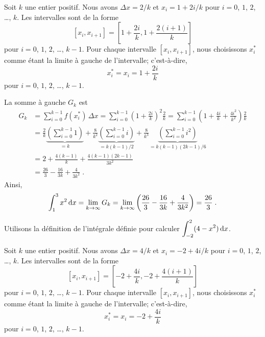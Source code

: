 {\begin{egg}
Soit $k$ une entier positif.  Nous avons $\Delta x = 2/k$ et
$x_i = 1 + 2i/k$ pour $i=0$, $1$, $2$, \ldots, $k$.  Les intervalles
sont de la forme
\[
[x_i,x_{i+1}] = \left[1+ \frac{2i}{k}, 1+ \frac{2(i+1)}{k}\right]
\]
pour $i=0$, $1$, $2$, \ldots, $k-1$.  Pour chaque intervalle
$[x_i, x_{i+1}]$, nous choisissons $x_i^\ast$ comme étant la limite à gauche
de l'intervalle; c'est-à-dire,
\[
x_i^\ast = x_i = 1+ \frac{2i}{k}
\]
pour $i=0$, $1$, $2$, \ldots, $k-1$.

La somme à gauche $G_k$ est
\begin{align*}
G_k &= \sum_{i=0}^{k-1} f(x_i^\ast) \, \Delta x 
= \sum_{i=0}^{k-1} \left(1+\frac{2i}{k}\right)^2 \frac{2}{k}
= \sum_{i=0}^{k-1} \left(1 + \frac{4i}{k} + \frac{4 i^2}{k^2} \right)
\frac{2}{k} \\
&= \frac{2}{k} \underbrace{\left( \sum_{i=0}^{k-1} 1 \right)}_{=k}
+ \frac{8}{k^2} \underbrace{\left( \sum_{i=0}^{k-1} i \right)}_{=k(k-1)/2}
+ \frac{8}{k^3}
\underbrace{\left( \sum_{i=0}^{k-1} i^2 \right)}_{=k(k-1)(2k-1)/6} \\
&= 2 + \frac{4(k-1)}{k} + \frac{4(k-1)(2k-1)}{3k^2} \\
&= \frac{26}{3} - \frac{16}{3k} + \frac{4}{3k^2} \; .
\end{align*}
Ainsi,
\[
\int_1^3 x^2\,\mathrm{d}x = \lim_{k\rightarrow \infty} G_k
= \lim_{k\rightarrow \infty}
\left(\frac{26}{3} - \frac{16}{3k} + \frac{4}{3k^2}\right) =
\frac{26}{3} \; .
\]
\label{egg_riemann}
\end{egg}


\begin{egg}
Utilisons la définition de l'intégrale définie pour calculer
$\displaystyle \int_{-2}^2 (4-x^2) \,\mathrm{d}x$.

Soit $k$ une entier positif.  Nous avons $\Delta x = 4/k$ et
$x_i = -2 + 4i/k$ pour $i=0$, $1$, $2$, \ldots, $k$.  Les intervalles
sont de la forme
\[
[x_i,x_{i+1}] = [-2+ \frac{4i}{k}, -2+ \frac{4(i+1)}{k}]
\]
pour $i=0$, $1$, $2$, \ldots, $k-1$.  Pour chaque intervalle
$[x_i, x_{i+1}]$, nous choisissons $x_i^\ast$ comme étant la limite à gauche
de l'intervalle; c'est-à-dire,
\[
x_i^\ast = x_i = -2+ \frac{4i}{k}
\]
pour $i=0$, $1$, $2$, \ldots, $k-1$.


\end{egg}}
